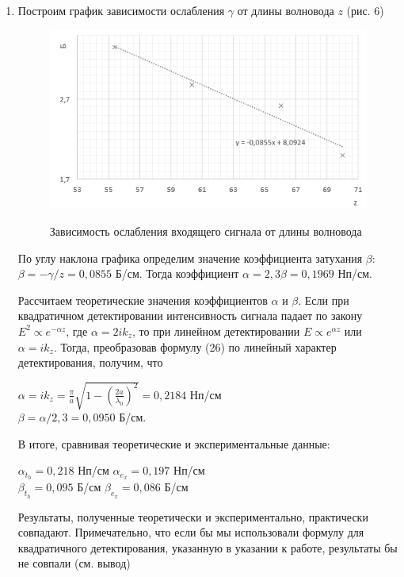 \documentclass[a4paper]{article}
\begin{document}
\begin{enumerate}
\item
Построим график зависимости ослабления $\gamma$ от длины волновода $z$ (рис. 6) \par
\begin{figure}[h]
    \centering
    \caption{Зависимость ослабления входящего сигнала от длины волновода}
    \includegraphics[width=15cm]{graph5.PNG}
    \label{fig:vac}
\end{figure}

По углу наклона графика определим значение коэффициента затухания $\beta$: $\beta = - \gamma/z = 0,0855$ Б/см. Тогда коэффициент $\alpha = 2,3\beta = 0,1969$ Нп/см.\par
Рассчитаем теоретические значения коэффициентов $\alpha$ и $\beta$. Если при квадратичном детектировании интенсивность сигнала падает по закону $E^2 \propto e^{-\alpha z}$, где $\alpha = 2ik_z$, то при линейном детектировании $E \propto e^{\alpha z}$ или $\alpha = ik_z$. Тогда, преобразовав формулу (26) по линейный характер детектирования, получим, что
\begin{center}
    $\alpha = ik_z = \frac{\pi}{a}\sqrt{1 - (\frac{2a}{\lambda_0})^2} = 0,2184$ Нп/см \\
    $\beta = \alpha / 2,3 = 0,0950$ Б/см. 
\end{center}
В итоге, сравнивая теоретические и экспериментальные данные:

\begin{center}
    $\alpha_t_h = 0,218$ Нп/см \hspace{1cm} $\alpha_e_x = 0,197$ Нп/см\\
    $\beta_t_h = 0,095$ Б/см \hspace{1cm} $\beta_e_x = 0,086$ Б/см
\end{center}

Результаты, полученные теоретически и экспериментально, практически совпадают. Примечательно, что если бы мы использовали формулу для квадратичного детектирования, указанную в указании к работе, результаты бы не совпали (см. вывод)

    
\end{enumerate}
\end{document}
